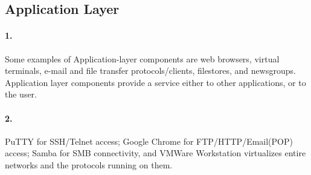 \documentclass[11pt]{article}
\begin{document}
\subsection{Application Layer}
\paragraph{1.}
Some examples of Application-layer components are web browsers, virtual terminals, e-mail and file transfer protocols/clients, filestores, and newsgroups. Application layer components provide a service either to other applications, or to the user.
\paragraph{2.}
PuTTY for SSH/Telnet access; Google Chrome for FTP/HTTP/Email(POP) access; Samba for SMB connectivity, and VMWare Workstation virtualizes entire networks and the protocols running on them.


\pagebreak
\end{document}

